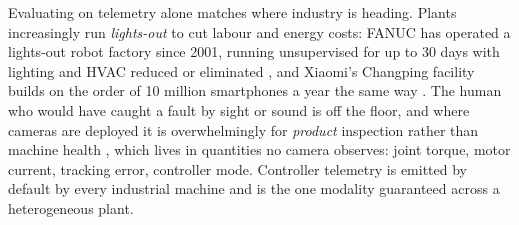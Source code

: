 %
%

\ifworkshopcompact
Evaluating on telemetry alone matches where industry is heading. Plants increasingly run \emph{lights-out} to cut labour and energy costs: FANUC has operated a lights-out robot factory since 2001, running unsupervised for up to 30 days with lighting and HVAC reduced or eliminated \cite{imts2026lightsout}, and Xiaomi's Changping facility builds on the order of 10 million smartphones a year the same way \cite{metrology2024darkfactory}. The human who would have caught a fault by sight or sound is off the floor, and where cameras are deployed it is overwhelmingly for \emph{product} inspection rather than machine health \cite{metrology2024darkfactory}, which lives in quantities no camera observes: joint torque, motor current, tracking error, controller mode. Controller telemetry is emitted by default by every industrial machine and is the one modality guaranteed across a heterogeneous plant.

